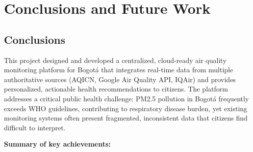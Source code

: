 \chapter{Conclusions and Future Work}
\label{ch:con}

\section{Conclusions}
\label{sec:conclusions}

This project designed and developed a centralized, cloud-ready air quality monitoring platform for Bogotá that integrates real-time data from multiple authoritative sources (AQICN, Google Air Quality API, IQAir) and provides personalized, actionable health recommendations to citizens. The platform addresses a critical public health challenge: PM2.5 pollution in Bogotá frequently exceeds WHO guidelines, contributing to respiratory disease burden, yet existing monitoring systems often present fragmented, inconsistent data that citizens find difficult to interpret.

\textbf{Summary of key achievements:}

